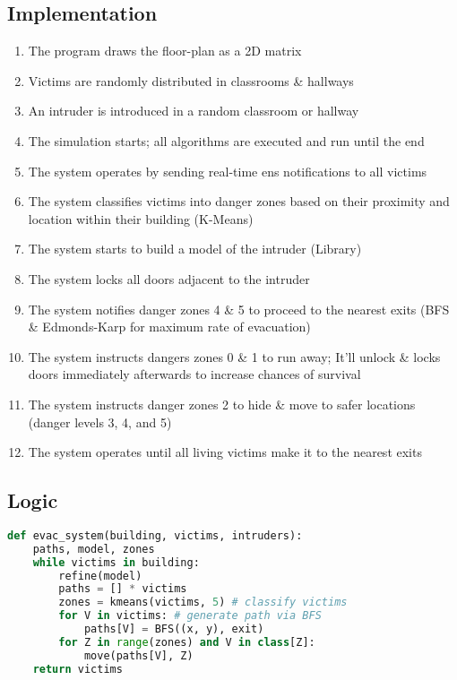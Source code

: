 \documentclass[12pt]{article}
\begin{document}
\subsection*{Implementation}
\begin{enumerate}
\item The program draws the floor-plan as a 2D matrix
\item Victims are randomly distributed in classrooms \& hallways
\item An intruder is introduced in a random classroom or hallway
\item The simulation starts; all algorithms are executed and run until the end
\item The system operates by sending real-time ens notifications to all victims
\item The system classifies victims into danger zones based on their proximity and location within their building (K-Means)
\item The system starts to build a model of the intruder (Library)
\item The system locks all doors adjacent to the intruder
\item The system notifies danger zones 4 \& 5 to proceed to the nearest exits (BFS \& Edmonds-Karp for maximum rate of evacuation)
\item The system instructs dangers zones 0 \& 1 to run away; It'll unlock \& locks doors immediately afterwards to increase chances of survival
\item The system instructs danger zones 2 to hide \& move to safer locations (danger levels 3, 4, and 5)
\item The system operates until all living victims make it to the nearest exits
\end{enumerate}
\subsection*{Logic}
\begin{lstlisting}[language=python]
def evac_system(building, victims, intruders):
	paths, model, zones
	while victims in building: 
		refine(model)
		paths = [] * victims
		zones = kmeans(victims, 5) # classify victims
		for V in victims: # generate path via BFS
			paths[V] = BFS((x, y), exit) 
		for Z in range(zones) and V in class[Z]:
			move(paths[V], Z)
	return victims
\end{lstlisting}
\end{document}
